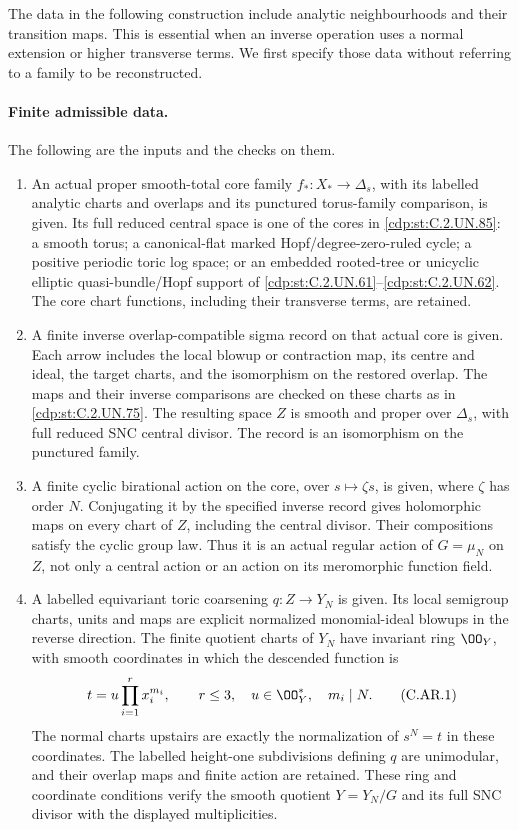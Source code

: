 
The data in the following construction include analytic
neighbourhoods and their transition maps. This is essential
when an inverse operation uses a normal extension or higher
transverse terms. We first specify those data without
referring to a family to be reconstructed.

\paragraph{Finite admissible data.}
The following are the inputs and the checks on them.
\begin{enumerate}
\item An actual proper smooth-total core family
\(f_*:X_*\to\Delta_s\), with its labelled analytic
charts and overlaps and its punctured torus-family
comparison, is given. Its full reduced central space
is one of the cores in \ref{cdp:st:C.2.UN.85}: a smooth torus; a
canonical-flat marked Hopf/degree-zero-ruled cycle;
a positive periodic toric log space; or an embedded
rooted-tree or unicyclic elliptic quasi-bundle/Hopf
support of \ref{cdp:st:C.2.UN.61}--\ref{cdp:st:C.2.UN.62}. The core chart functions,
including their transverse terms, are retained.

\item A finite inverse overlap-compatible sigma record
on that actual core is given. Each arrow includes
the local blowup or contraction map, its centre
and ideal, the target charts, and the isomorphism
on the restored overlap. The maps and their inverse
comparisons are checked on these charts as in \ref{cdp:st:C.2.UN.75}.
The resulting space \(Z\) is smooth and proper over
\(\Delta_s\), with full reduced SNC central divisor.
The record is an isomorphism on the punctured family.

\item A finite cyclic birational action on the core,
over \(s\mapsto\zeta s\), is given, where \(\zeta\)
has order \(N\). Conjugating it by the specified
inverse record gives holomorphic maps on every
chart of \(Z\), including the central divisor.
Their compositions satisfy the cyclic group law.
Thus it is an actual regular action of
\(G=\mu_N\) on \(Z\), not only a central action
or an action on its meromorphic function field.

\item A labelled equivariant toric coarsening
\(q:Z\to Y_N\) is given. Its local semigroup
charts, units and maps are explicit normalized
monomial-ideal blowups in the reverse direction.
The finite quotient charts of \(Y_N\) have
invariant ring \(\OO_Y\), with smooth coordinates
in which the descended function is
\[
                  t=u\prod_{i=1}^r x_i^{m_i},
              \qquad r\le3,\quad u\in\OO_Y^*,
              \quad m_i\mid N.
 \tag{C.AR.1}\label{cdp:eq:C.AR.1}
\]
The normal charts upstairs are exactly the
normalization of \(s^N=t\) in these coordinates.
The labelled height-one subdivisions defining
\(q\) are unimodular, and their overlap maps
and finite action are retained. These ring and
coordinate conditions verify the smooth quotient
\(Y=Y_N/G\) and its full SNC divisor with
the displayed multiplicities.


\end{enumerate}
